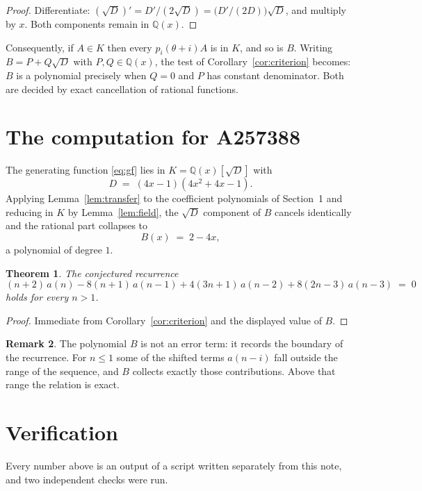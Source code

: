 \documentclass[11pt,a4paper]{article}
\theoremstyle{plain}
\newtheorem{theorem}{Theorem}
\theoremstyle{definition}
\newtheorem{remark}[theorem]{Remark}
\begin{document}
\begin{proof}
Differentiate: $(\sqrt{D})'=D'/(2\sqrt{D})=\bigl(D'/(2D)\bigr)\sqrt{D}$, and multiply by
$x$. Both components remain in $\mathbb{Q}(x)$.
\end{proof}

Consequently, if $A\in K$ then every $p_{i}(\theta+i)A$ is in $K$, and so is $B$. Writing
$B=P+Q\sqrt{D}$ with $P,Q\in\mathbb{Q}(x)$, the test of Corollary~\ref{cor:criterion}
becomes: $B$ is a polynomial precisely when $Q=0$ and $P$ has constant denominator. Both
are decided by exact cancellation of rational functions.

\section{The computation for A257388}

The generating function \eqref{eq:gf} lies in $K=\mathbb{Q}(x)[\sqrt{D}]$ with
\[
D \;=\; \left(4 x - 1\right) \left(4 x^{2} + 4 x - 1\right) .
\]
Applying Lemma~\ref{lem:transfer} to the coefficient polynomials of Section~1 and reducing
in $K$ by Lemma~\ref{lem:field}, the $\sqrt{D}$ component of $B$ cancels identically and
the rational part collapses to
\[
B(x)\;=\;2 - 4 x ,
\]
a polynomial of degree $1$.

\begin{theorem}
The conjectured recurrence
\[
(n + 2)\,a(n) -  8 \left(n + 1\right)\,a(n-1) + 4 \left(3 n + 1\right)\,a(n-2) + 8 \left(2 n - 3\right)\,a(n-3) \;=\;0
\]
holds for every $n>1$.
\end{theorem}

\begin{proof}
Immediate from Corollary~\ref{cor:criterion} and the displayed value of $B$.
\end{proof}

\begin{remark}
The polynomial $B$ is not an error term: it records the boundary of the recurrence. For
$n\le1$ some of the shifted terms $a(n-i)$ fall outside the range of the sequence,
and $B$ collects exactly those contributions. Above that range the relation is exact.
\end{remark}

\section{Verification}

Every number above is an output of a script written separately from this note, and two
independent checks were run.
\end{document}
